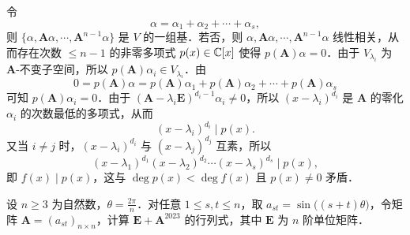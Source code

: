 \begin{solution}
令
\[
\alpha=\alpha_{1}+\alpha_{2}+\cdots+\alpha_{s},
\]
则 $\{\alpha,\bm{A}\alpha,\cdots,\bm{A}^{n-1}\alpha\}$ 是 $V$ 的一组基．若否，则 $\alpha,\bm{A}\alpha,\cdots,\bm{A}^{n-1}\alpha$ 线性相关，从而存在次数 $\le n-1$ 的非零多项式 $p(x)\in\mathbb{C}[x]$ 使得 $p(\bm{A})\alpha=0$．由于 $V_{\lambda_{i}}$ 为 $\bm{A}$-不变子空间，所以 $p(\bm{A})\alpha_{i}\in V_{\lambda_{i}}$．由
\[
0=p(\bm{A})\alpha=p(\bm{A})\alpha_{1}+p(\bm{A})\alpha_{2}+\cdots+p(\bm{A})\alpha_{s}
\]
可知 $p(\bm{A})\alpha_{i}=0$．由于 $(\bm{A}-\lambda_{i}\bm{E})^{d_{i}-1}\alpha_{i}\neq 0$，所以 $(x-\lambda_{i})^{d_{i}}$ 是 $\bm{A}$ 的零化 $\alpha_{i}$ 的次数最低的多项式，从而
\[
(x-\lambda_{i})^{d_{i}}\mid p(x).
\]
又当 $i\neq j$ 时，$(x-\lambda_{i})^{d_{i}}$ 与 $(x-\lambda_{j})^{d_{j}}$ 互素，所以
\[
(x-\lambda_{1})^{d_{1}}(x-\lambda_{2})^{d_{2}}\cdots(x-\lambda_{s})^{d_{s}}\mid p(x),
\]
即 $f(x)\mid p(x)$，这与 $\deg p(x)<\deg f(x)$ 且 $p(x)\neq 0$ 矛盾．
\end{solution}

设 $n\ge 3$ 为自然数，$\theta=\frac{2\pi}{n}$．对任意 $1\le s,t\le n$，取 $a_{st}=\sin\bigl((s+t)\theta\bigr)$，令矩阵 $\bm{A}=(a_{st})_{n\times n}$，计算 $\bm{E}+\bm{A}^{2023}$ 的行列式，其中 $\bm{E}$ 为 $n$ 阶单位矩阵．

